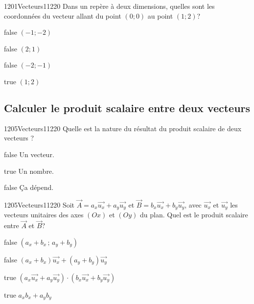 \documentclass[11pt]{article}
\begin{document}
        	\begin{question}{1201}{Vecteurs}{1}{1220}
				Dans un repère à deux dimensions, quelles sont les coordonnées du vecteur allant du point $(0;0)$ au point $(1;2)$?
            \end{question}

            \begin{reponses}
            	\item[false] $(-1;-2)$
            	\item[false] $(2;1)$
                \item[false] $(-2;-1)$
                \item[true] $(1;2)$
            \end{reponses}

      
	\subsection{Calculer le produit scalaire entre deux vecteurs}
            
		
            \begin{question}{1205}{Vecteurs}{1}{1220}
				Quelle est la nature du résultat du produit scalaire de deux vecteurs ?
            \end{question}

            \begin{reponses}
            	\item[false] Un vecteur.
            	\item[true] Un nombre.
            	\item[false] Ça dépend.
            \end{reponses}
            
            \begin{question}{1205}{Vecteurs}{1}{1220}
				Soit $\vec{A}=a_x\vec{u_x}+a_y\vec{u_y}$ et $\vec{B}=b_x\vec{u_x}+b_y\vec{u_y}$, avec $\vec{u_x}$ et $\vec{u_y}$ les vecteurs unitaires des axes $(Ox)$ et $(Oy)$ du plan. Quel est le produit scalaire entre $\vec{A}$ et $\vec{B}$?
            \end{question}

            \begin{reponses}
            	\item[false] $(a_x+b_x\,;\,a_y+b_y)$
            	\item[false] $(a_x+b_x )\vec{u_x}+(a_y+b_y)\vec{u_y}$
                \item[true] $(a_x\vec{u_x}+a_y\vec{u_y})\cdot(b_x\vec{u_x}+b_y\vec{u_y})$
                \item[true] $a_x b_x+a_y b_y$
            \end{reponses}
			
\end{document}
